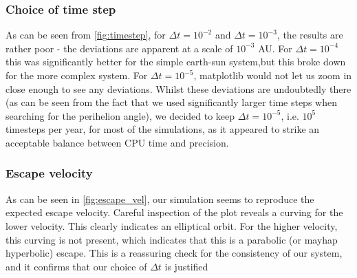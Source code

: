 \documentclass[a4paper, 10pt]{article}
\begin{document}
\subsubsection{Choice of time step}
As can be seen from \cref{fig:timestep}, for $\Delta t=10^{-2}$ and $\Delta t= 10^{-3}$, the results are rather poor - the deviations are apparent at a scale of $10^{-3}$ AU. For $\Delta t= 10^{-4}$ this was significantly better for the simple earth-sun system,but this broke down for the more complex system. For $\Delta t = 10^{-5}$, matplotlib would not let us zoom in close enough to see any deviations. Whilst these deviations are undoubtedly there (as can be seen from the fact that we used significantly larger time steps when searching for the perihelion angle), we decided to keep $\Delta t = 10^{-5}$, i.e. $10^5$ timesteps per year, for most of the simulations, as it appeared to strike an acceptable balance between CPU time and precision.
\subsubsection{Escape velocity}
As can be seen in \cref{fig:escape_vel}, our simulation seems to reproduce the expected escape velocity. Careful inspection of the plot reveals a curving for the lower velocity. This clearly indicates an elliptical orbit. For the higher velocity, this curving is not present, which indicates that this is a parabolic (or mayhap hyperbolic) escape. This is a reassuring check for the consistency of our system, and it confirms that our choice of $\Delta t$ is justified
\end{document}
